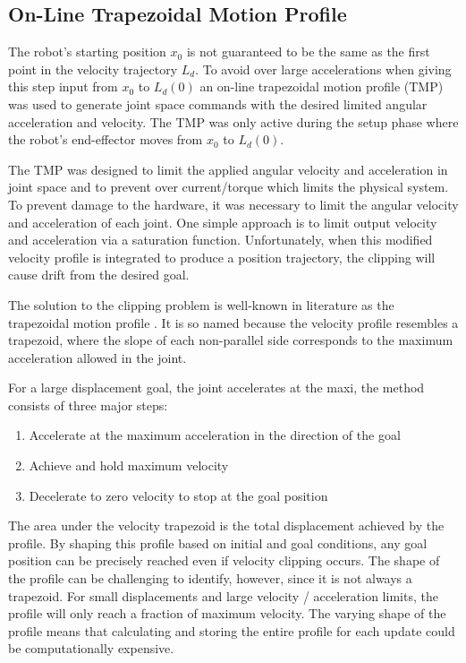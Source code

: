 \subsection{On-Line Trapezoidal Motion Profile}

The robot's starting position $x_0$ is not guaranteed to be the same as the first point in the velocity trajectory $L_d$.  To avoid over large accelerations when giving this step input from $x_0$ to $L_d(0)$ an on-line trapezoidal motion profile (TMP) was used to generate joint space commands with the desired limited angular acceleration and velocity.  The TMP was only active during the setup phase where the robot's end-effector moves from $x_0$ to $L_d(0)$.

The TMP was designed to limit the applied angular velocity and acceleration in joint space and to prevent over current/torque which limits the physical system. 
To prevent damage to the hardware, it was
necessary to limit the angular velocity and acceleration of each joint. One
simple approach is to limit output velocity and acceleration via a saturation
function.  Unfortunately, when this modified velocity profile is integrated to
produce a position trajectory, the clipping will cause drift from the desired
goal.

The solution to the clipping problem is well-known in literature as the
trapezoidal motion profile \cite{XXX}. It is so named because the velocity
profile resembles a trapezoid, where the slope of each non-parallel side
corresponds to the maximum acceleration allowed in the joint. 

For a large displacement goal, the
joint accelerates at the maxi, the method consists of three major steps:

\begin{enumerate}
\item Accelerate at the maximum acceleration in the direction of the goal
\item Achieve and hold maximum velocity
\item Decelerate to zero velocity to stop at the goal position
\end{enumerate}

The area under the velocity trapezoid is the total displacement achieved by the
profile. By shaping this profile based on initial and goal conditions, any
goal position can be precisely reached even if velocity clipping occurs. The
shape of the profile can be challenging to identify, however, since it is not
always a trapezoid. For small displacements and large velocity / acceleration
limits, the profile will only reach a fraction of maximum velocity. The varying
shape of the profile means that calculating and storing the entire profile for
each update could be computationally expensive. 

